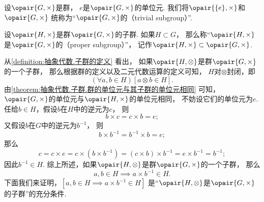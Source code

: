\begin{definition}
设\(\opair{G,\times}\)是群，
\(e\)是\(\opair{G,\times}\)的单位元.
我们将\(\opair{\{e\},\times}\)和\(\opair{G,\times}\)
统称为“\(\opair{G,\times}\)的（trivial subgroup）”.
\end{definition}

\begin{definition}
设\(\opair{H,\times}\)是群\(\opair{G,\times}\)的子群.
如果\(H \subset G\)，
那么称“\(\opair{H,\times}\)是\(\opair{G,\times}\)的（proper subgroup）”，
记作\(\opair{H,\times}\subset\opair{G,\times}\).
\end{definition}

从\cref{definition:抽象代数.子群的定义} 看出，
如果\(\opair{H,\otimes}\)是群\(\opair{G,\times}\)的一个子群，
那么根据群的定义以及二元代数运算的定义可知，
\(H\)对\(\otimes\)封闭，即\[
	(\forall a,b \in H)[a \otimes b \in H].
\]
由\cref{theorem:抽象代数.子群.群的单位元与其子群的单位元相同} 可知，
\(\opair{G,\times}\)的单位元与\(\opair{H,\times}\)的单位元相同，
不妨设它们的单位元为\(e\).
任给\(b \in H\)，假设\(b\)在\(H\)中的逆元为\(c\)，
则\[
	b \times c = c \times b = e;
\]
又假设\(b\)在\(G\)中的逆元为\(b^{-1}\)，
则\[
	b \times b^{-1} = b^{-1} \times b = e;
\]
那么\[
	c = c \times e
	= c \times (b \times b^{-1})
	= (c \times b) \times b^{-1}
	= e \times b^{-1}
	= b^{-1};
\]
因此\(b^{-1} \in H\).
综上所述，如果\(\opair{H,\otimes}\)是群\(\opair{G,\times}\)的一个子群，
那么\[
	a,b \in H
	\implies
	a \times b^{-1} \in H.
\]
下面我们来证明，\([a,b \in H \implies a \times b^{-1} \in H]\)
是“\(\opair{H,\otimes}\)是\(\opair{G,\times}\)的子群”的充分条件.

